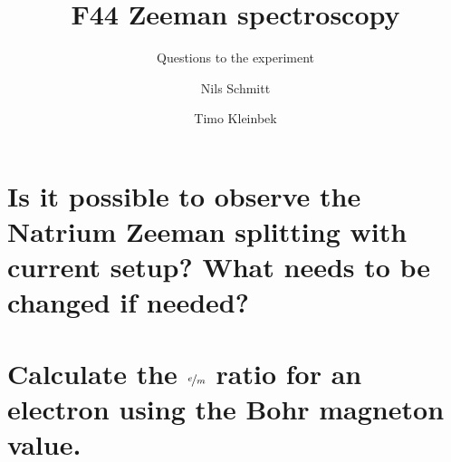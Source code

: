 \documentclass[12pt,
				 a4paper,
				 ]{scrartcl}
\title{F44 Zeeman spectroscopy}
\subtitle{Questions to the experiment}
\author{Nils Schmitt \and Timo Kleinbek}
\date{}
\numberwithin{equation}{section}
\begin{document}
\maketitle
\section*{Is it possible to observe the Natrium Zeeman splitting with current setup?
What needs to be changed if needed?}




\section*{Calculate the $\nicefrac{e}{m}$ ratio for an electron using the Bohr magneton value.}
\end{document}
